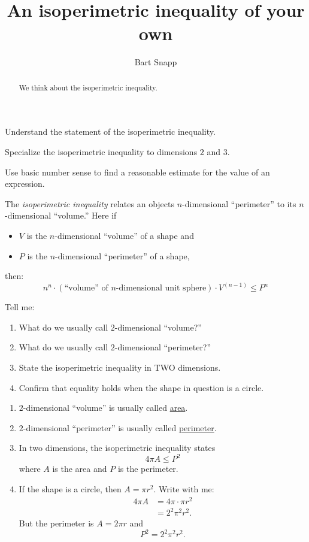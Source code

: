 \documentclass[nooutcomes,noauthor,handout]{ximera}
\title{An isoperimetric inequality of your own}
\author{Bart Snapp}
\begin{document}
\begin{abstract}
  We think about the isoperimetric inequality.
\end{abstract}
\maketitle


\begin{listOutcomes}
\item Understand the statement of the isoperimetric inequality.
\item Specialize the isoperimetric inequality to dimensions $2$ and
  $3$.
\item Use basic number sense to find a reasonable estimate for the
  value of an expression.
\end{listOutcomes}

The \textit{isoperimetric inequality} relates an objects
$n$-dimensional ``perimeter'' to its $n$-dimensional ``volume.'' Here
if
\begin{itemize}
\item $V$ is the $n$-dimensional ``volume'' of a shape and 
\item $P$ is the $n$-dimensional ``perimeter'' of a shape,
\end{itemize}
then:
\[
n^n \cdot  (\text{``volume'' of $n$-dimensional unit sphere})\cdot  V^{(n-1)} \le P^n 
\]



\mynewpage


\begin{question}
  Tell me:
  \begin{enumerate}
  \item What do we usually call $2$-dimensional ``volume?''
  \item What do we usually call $2$-dimensional ``perimeter?''
  \item State the isoperimetric inequality in TWO dimensions.
  \item Confirm that equality holds when the shape in question is a
    circle.
  \end{enumerate}
  \begin{freeResponse}
    \begin{enumerate}
    \item $2$-dimensional ``volume'' is usually called \underline{area}.
    \item $2$-dimensional ``perimeter'' is usually called \underline{perimeter}.
    \item In two dimensions, the isoperimetric inequality states
      \[
      4 \pi A \le P^2
      \]
      where $A$ is the area and $P$ is the perimeter.
    \item If the shape is a circle, then $A = \pi r^2$. Write with me:
      \begin{align*}
        4 \pi A &= 4 \pi \cdot \pi r^2 \\
        &= 2^2 \pi^2 r^2.
      \end{align*}
      But the perimeter is $A = 2\pi r$ and
      \[
      P^2 = 2^2 \pi^2 r^2.
      \]
    \end{enumerate}
  \end{freeResponse}
\end{question}
\mynewpage
\end{document}
